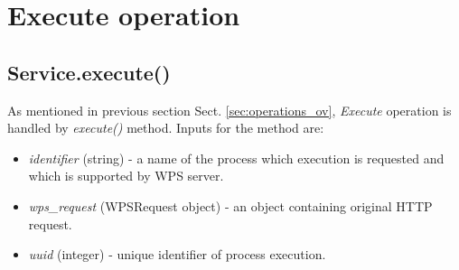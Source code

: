 \documentclass[12pt,a4paper]{article}
\begin{document}
\section{Execute operation}
\subsection{Service.execute()}
As mentioned in previous section Sect. \ref{sec:operations_ov}, \textit{Execute} operation is handled by \textit{execute()} method.
Inputs for the method are:
\begin{itemize}
\item \textit{identifier} (string) - a name of the process which execution is requested and which is supported by WPS server.
\item \textit{wps\_request} (WPSRequest object) - an object containing original HTTP request.
\item \textit{uuid} (integer) - unique identifier of process execution.
\end{itemize}

\begin{figure}[h!]
\centering
\begin{floatrow}
\end{floatrow}
\end{figure}
\end{document}
